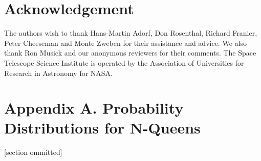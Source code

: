 \documentclass[twoside,12pt,titlepage,a4paper]{article}
\begin{document}

\section{Acknowledgement}
The authors wish to thank Hans-Martin Adorf, Don Rosenthal, 
Richard Franier, Peter Cheeseman and Monte Zweben for their assistance
and advice.  We also thank Ron Musick and our anonymous reviewers for
their comments.  The Space Telescope Science Institute is operated by
the Association of Universities for Research in Astronomy for NASA.

\appendix
\section*{Appendix A. Probability Distributions for N-Queens}


[section ommitted]



\vskip 0.2in


\end{document}
